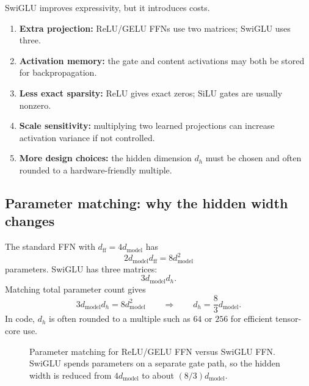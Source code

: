 \documentclass[11pt,a4paper]{article}
\theoremstyle{definition}
\theoremstyle{plain}
\newcommand{\dmodel}{d_{\mathrm{model}}}
\newcommand{\dff}{d_{\mathrm{ff}}}
\begin{document}
\begin{tradeoffbox}
SwiGLU improves expressivity, but it introduces costs.
\begin{enumerate}[nosep]
    \item \textbf{Extra projection:} ReLU/GELU FFNs use two matrices; SwiGLU uses three.
    \item \textbf{Activation memory:} the gate and content activations may both be stored for backpropagation.
    \item \textbf{Less exact sparsity:} ReLU gives exact zeros; SiLU gates are usually nonzero.
    \item \textbf{Scale sensitivity:} multiplying two learned projections can increase activation variance if not controlled.
    \item \textbf{More design choices:} the hidden dimension $d_h$ must be chosen and often rounded to a hardware-friendly multiple.
\end{enumerate}
\end{tradeoffbox}

\subsection{Parameter matching: why the hidden width changes}

The standard FFN with $\dff=4\dmodel$ has
\begin{equation}
    2\dmodel\dff=8\dmodel^2
\end{equation}
parameters. SwiGLU has three matrices:
\begin{equation}
    3\dmodel d_h.
\end{equation}
Matching total parameter count gives
\begin{equation}
    3\dmodel d_h=8\dmodel^2
    \qquad\Rightarrow\qquad
    d_h=\frac{8}{3}\dmodel.
\end{equation}
In code, $d_h$ is often rounded to a multiple such as $64$ or $256$ for efficient tensor-core use.

\begin{figure}[H]
\centering
{}
\caption{Parameter matching for ReLU/GELU FFN versus SwiGLU FFN. SwiGLU spends parameters on a separate gate path, so the hidden width is reduced from $4\dmodel$ to about $(8/3)\dmodel$.}
\label{fig:swiglu-param-matching}
\end{figure}
\end{document}
